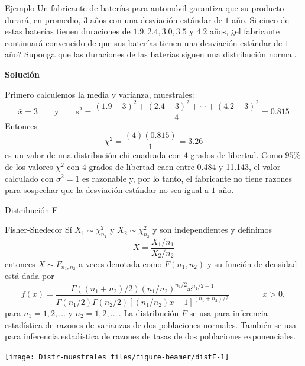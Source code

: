 \documentclass[
  10pt,
  ignorenonframetext,
]{beamer}
\begin{document}
\begin{frame}{}
\protect\hypertarget{section-55}{}
\begin{block}{Ejemplo}
\protect\hypertarget{ejemplo-2}{}
Un fabricante de baterías para automóvil garantiza que su producto
durará, en promedio, \(3\) años con una desviación estándar de \(1\)
año. Si cinco de estas baterías tienen duraciones de
\(1.9, 2.4, 3.0, 3.5\mbox{ y }4.2\) años, ¿el fabricante continuará
convencido de que sus baterías tienen una desviación estándar de \(1\)
año? Suponga que las duraciones de las baterías siguen una distribución
normal.

\textbf{Solución}

Primero calculemos la media y varianza, muestrales:
\[\bar{x}=3 \qquad \mbox{y} \qquad s^2 = \frac{(1.9-3)^2 + (2.4-3)^2 + \cdots + (4.2-3)^2}{4}=0.815\]
Entonces \[\chi^2=\frac{(4)(0.815)}{1}=3.26\] es un valor de una
distribución chi cuadrada con \(4\) grados de libertad. Como \(95\%\) de
los valores \(\chi^2\) con \(4\) grados de libertad caen entre 0.484 y
11.143, el valor calculado con \(\sigma^2 = 1\) es razonable y, por lo
tanto, el fabricante no tiene razones para sospechar que la desviación
estándar no sea igual a \(1\) año.
\end{block}
\end{frame}

\begin{frame}{Distribución F}
\protect\hypertarget{distribuciuxf3n-f}{}
\begin{block}{Fisher-Snedecor}
\protect\hypertarget{fisher-snedecor}{}
Sí \(X_1 \sim \chi_{n_1}^2\) y \(X_2 \sim \chi_{n_2}^2\) y son
independientes y definimos \[X=\frac{X_1/n_1}{X_2/n_2}\] entonces
\(X \sim F_{n_1,n_2}\) a veces denotada como \(F(n_{1},n_{2})\) y su
función de densidad está dada por \[
f(x) = \frac{\Gamma((n_{1}+n_{2})/2)(n_{1}/n_{2})^{n_{1}/2}x^{n_{1}/2-1}}
{\Gamma(n_{1}/2)\Gamma(n_{2}/2)[(n_{1}/n_{2})x+1]^{(n_{1}+n_{2})/2}} \qquad \qquad x > 0,
\] para \(n_{1} = 1,2,\ldots\) y \(n_{2} = 1,2,\ldots \,\). La
distribución \(F\) se usa para inferencia estadística de razones de
varianzas de dos poblaciones normales. También se usa para inferencia
estadística de razones de tasas de dos poblaciones exponenciales.
\end{block}
\end{frame}

\begin{frame}{}
\protect\hypertarget{section-56}{}
\begin{center}\texttt{[image: Distr-muestrales\_files/figure-beamer/distF-1]} \end{center}
\end{frame}
\end{document}
